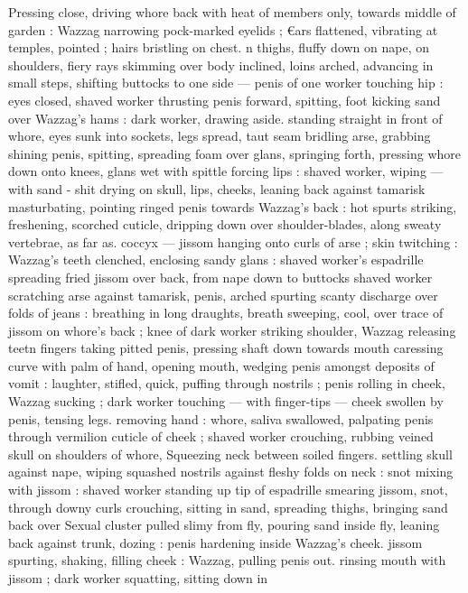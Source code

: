 Pressing close, driving whore back with heat of members only, 
towards middle of garden : Wazzag narrowing pock-marked eyelids ; 
€ars flattened, vibrating at temples, pointed ; hairs bristling on chest. 
n thighs, fluffy down on nape, on shoulders, fiery rays skimming 
over body inclined, loins arched, advancing in small steps, shifting 
buttocks to one side --- penis of one worker touching hip : eyes 
closed, shaved worker thrusting penis forward, spitting, foot kicking 
sand over Wazzag's hams : dark worker, drawing aside. standing 
straight in front of whore, eyes sunk into sockets, legs spread, taut 
seam bridling arse, grabbing shining penis, spitting, spreading foam 
over glans, springing forth, pressing whore down onto knees, glans 
wet with spittle forcing lips : shaved worker, wiping --- with sand - 
shit drying on skull, lips, cheeks, leaning back against tamarisk 
masturbating, pointing ringed penis towards Wazzag's back : hot 
spurts striking, freshening, scorched cuticle, dripping down over 
shoulder-blades, along sweaty vertebrae, as far as. coccyx --- jissom 
hanging onto curls of arse ; skin twitching : Wazzag's teeth 
clenched, enclosing sandy glans : shaved worker's espadrille 
spreading fried jissom over back, from nape down to buttocks 
shaved worker scratching arse against tamarisk, penis, arched 
spurting scanty discharge over folds of jeans : breathing in long 
draughts, breath sweeping, cool, over trace of jissom on whore's 
back ; knee of dark worker striking shoulder, Wazzag releasing teetn 
fingers taking pitted penis, pressing shaft down towards mouth 
caressing curve with palm of hand, opening mouth, wedging penis 
amongst deposits of vomit : laughter, stifled, quick, puffing through 
nostrils ; penis rolling in cheek, Wazzag sucking ; dark worker 
touching --- with finger-tips --- cheek swollen by penis, tensing legs. 
removing hand : whore, saliva swallowed, palpating penis through 
vermilion cuticle of cheek ; shaved worker crouching, rubbing veined 
skull on shoulders of whore, Squeezing neck between soiled fingers. 
settling skull against nape, wiping squashed nostrils against fleshy 
folds on neck : snot mixing with jissom : shaved worker standing up 
tip of espadrille smearing jissom, snot, through downy curls 
crouching, sitting in sand, spreading thighs, bringing sand back over 
Sexual cluster pulled slimy from fly, pouring sand inside fly, leaning 
back against trunk, dozing : penis hardening inside Wazzag's cheek. 
jissom spurting, shaking, filling cheek : Wazzag, pulling penis out. 
rinsing mouth with jissom ; dark worker squatting, sitting down in 

